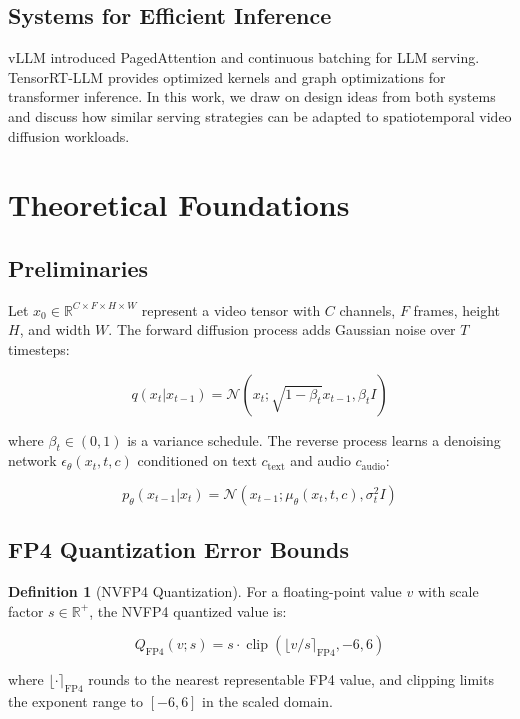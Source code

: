 \documentclass[journal,twoside]{IEEEtran}
\theoremstyle{definition}
\newtheorem{definition}[theorem]{Definition}
\theoremstyle{remark}
\newcommand{\RR}{\mathbb{R}}
\newcommand{\clip}{\operatorname{clip}}
\begin{document}
\subsection{Systems for Efficient Inference}
vLLM \cite{kwon2023efficient} introduced PagedAttention and continuous batching for LLM serving. TensorRT-LLM \cite{nvidia2024tensorrt} provides optimized kernels and graph optimizations for transformer inference. In this work, we draw on design ideas from both systems and discuss how similar serving strategies can be adapted to spatiotemporal video diffusion workloads.

\section{Theoretical Foundations}
\label{sec:theory}

\subsection{Preliminaries}
Let $x_0 \in \RR^{C \times F \times H \times W}$ represent a video tensor with $C$ channels, $F$ frames, height $H$, and width $W$. The forward diffusion process adds Gaussian noise over $T$ timesteps:

\begin{equation}
q(x_t | x_{t-1}) = \mathcal{N}(x_t; \sqrt{1-\beta_t} x_{t-1}, \beta_t I)
\end{equation}

where $\beta_t \in (0,1)$ is a variance schedule. The reverse process learns a denoising network $\epsilon_\theta(x_t, t, c)$ conditioned on text $c_{\text{text}}$ and audio $c_{\text{audio}}$:

\begin{equation}
p_\theta(x_{t-1} | x_t) = \mathcal{N}(x_{t-1}; \mu_\theta(x_t, t, c), \sigma_t^2 I)
\end{equation}

\subsection{FP4 Quantization Error Bounds}

\begin{definition}[NVFP4 Quantization]
For a floating-point value $v$ with scale factor $s \in \RR^+$, the NVFP4 quantized value is:

\begin{equation}
Q_{\text{FP4}}(v; s) = s \cdot \clip(\lfloor v/s \rceil_{\text{FP4}}, -6, 6)
\end{equation}

where $\lfloor \cdot \rceil_{\text{FP4}}$ rounds to the nearest representable FP4 value, and clipping limits the exponent range to $[-6, 6]$ in the scaled domain.
\end{definition}
\end{document}
